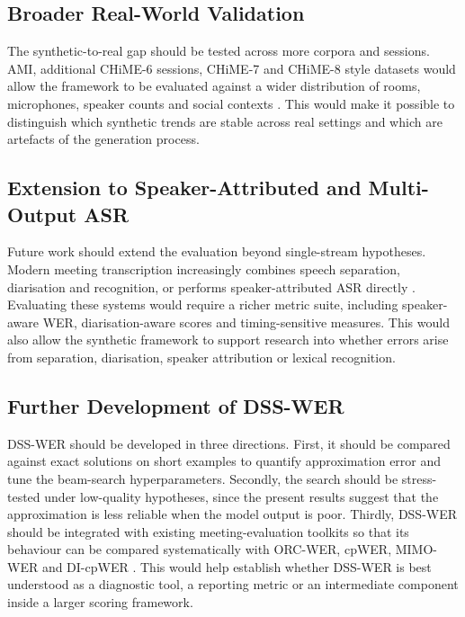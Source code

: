 \subsection{Broader Real-World Validation}
The synthetic-to-real gap should be tested across more corpora and sessions. AMI, additional CHiME-6 sessions, CHiME-7 and CHiME-8 style datasets would allow the framework to be evaluated against a wider distribution of rooms, microphones, speaker counts and social contexts \citep{carletta2005ami, chime7, cornell2024chime8dasrchallengegeneralizable}. This would make it possible to distinguish which synthetic trends are stable across real settings and which are artefacts of the generation process.

\subsection{Extension to Speaker-Attributed and Multi-Output ASR}
Future work should extend the evaluation beyond single-stream hypotheses. Modern meeting transcription increasingly combines speech separation, diarisation and recognition, or performs speaker-attributed ASR directly \citep{raj2020integrationspeechseparationdiarization, chen2020continuousspeechseparationconformer, kanda2021endtoendspeakerattributedasrtransformer, kanda2022transcribetodiarizeneuralspeakerdiarization, cui2024improvingspeakerassignmentspeakerattributed, raj2024speakerattributionsurt, zheng2025dncasrendtoendtrainingspeakerattributed}. Evaluating these systems would require a richer metric suite, including speaker-aware WER, diarisation-aware scores and timing-sensitive measures. This would also allow the synthetic framework to support research into whether errors arise from separation, diarisation, speaker attribution or lexical recognition.

\subsection{Further Development of DSS-WER}
DSS-WER should be developed in three directions. First, it should be compared against exact solutions on short examples to quantify approximation error and tune the beam-search hyperparameters. Secondly, the search should be stress-tested under low-quality hypotheses, since the present results suggest that the approximation is less reliable when the model output is poor. Thirdly, DSS-WER should be integrated with existing meeting-evaluation toolkits so that its behaviour can be compared systematically with ORC-WER, cpWER, MIMO-WER and DI-cpWER \citep{vonneumann2024meetevaltoolkitcomputationword, Word_Error_Rate_Definitions}. This would help establish whether DSS-WER is best understood as a diagnostic tool, a reporting metric or an intermediate component inside a larger scoring framework.

